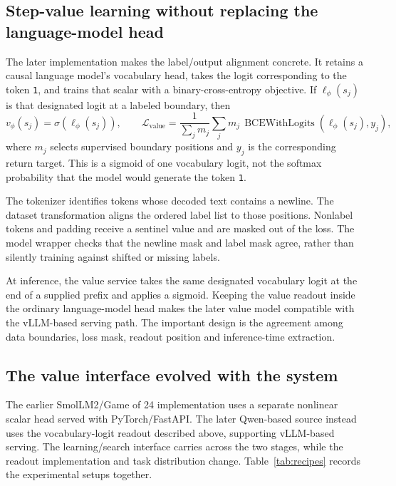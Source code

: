 \documentclass[11pt,letterpaper]{article}
\begin{document}
\subsection{Step-value learning without replacing the language-model head}
The later implementation makes the label/output alignment concrete. It retains a causal language model's vocabulary head, takes the logit corresponding to the token \texttt{1}, and trains that scalar with a binary-cross-entropy objective. If $\ell_\phi(s_j)$ is that designated logit at a labeled boundary, then
\begin{equation}
v_\phi(s_j)=\sigma\!\left(\ell_\phi(s_j)\right),\qquad
\mathcal L_{\mathrm{value}}=
\frac{1}{\sum_j m_j}\sum_j m_j\,\operatorname{BCEWithLogits}
\left(\ell_\phi(s_j),y_j\right),
\label{eq:value}
\end{equation}
where $m_j$ selects supervised boundary positions and $y_j$ is the corresponding return target. This is a sigmoid of one vocabulary logit, not the softmax probability that the model would generate the token \texttt{1}.

The tokenizer identifies tokens whose decoded text contains a newline. The dataset transformation aligns the ordered label list to those positions. Nonlabel tokens and padding receive a sentinel value and are masked out of the loss. The model wrapper checks that the newline mask and label mask agree, rather than silently training against shifted or missing labels.

At inference, the value service takes the same designated vocabulary logit at the end of a supplied prefix and applies a sigmoid. Keeping the value readout inside the ordinary language-model head makes the later value model compatible with the vLLM-based serving path. The important design is the agreement among data boundaries, loss mask, readout position and inference-time extraction.

\subsection{The value interface evolved with the system}
The earlier SmolLM2/Game of 24 implementation uses a separate nonlinear scalar head served with PyTorch/FastAPI. The later Qwen-based source instead uses the vocabulary-logit readout described above, supporting vLLM-based serving. The learning/search interface carries across the two stages, while the readout implementation and task distribution change. Table~\ref{tab:recipes} records the experimental setups together.
\end{document}
